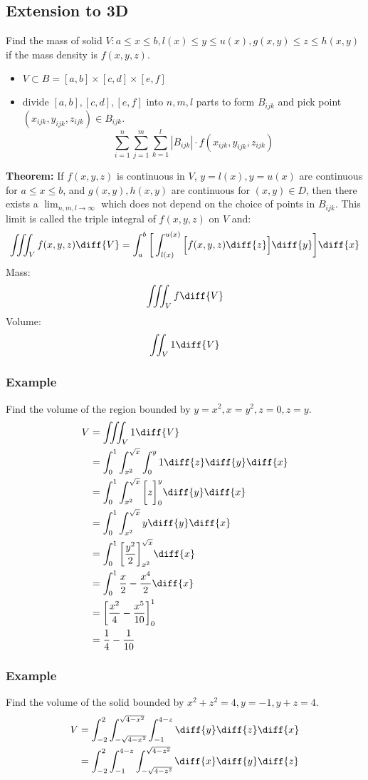 \documentclass{math}
\begin{document}
\subsection*{Extension to 3D}
Find the mass of solid \( V:a\le x\le b, l(x)\le y\le u(x), g(x,y)\le z\le
h(x,y) \) if the mass density is \( f(x,y,z) \).
\begin{itemize}
  \item \( V\subset B = [a,b]\times[c,d]\times[e,f] \)
  \item divide \( [a,b],[c,d],[e,f] \) into \( n,m,l \) parts to form
  \( B_{ijk} \) and pick point \( (x_{ijk},y_{ijk},z_{ijk})\in B_{ijk} \).
  \[ \sum_{i=1}^{n}\sum_{j=1}^{m}\sum_{k=1}^{l}|B_{ijk}|\cdot
    f(x_{ijk},y_{ijk},z_{ijk}) \]
\end{itemize}
\textbf{Theorem:} If \( f(x,y,z) \) is continuous in \( V \), \( y = l(x),
y = u(x) \) are continuous for \( a\le x\le b \), and \( g(x,y),h(x,y) \) are
continuous for \( (x,y)\in D \), then there exists a \( \lim_{n,m,l\to\infty} \)
which does not depend on the choice of points in \( B_{ijk} \). This limit is
called the triple integral of \( f(x,y,z) \) on \( V \) and:
\[ \iiint_{V}f(x,y,z)\diff{V} = \int_{a}^{b}\bigg[\int_{l(x)}^{u(x)}\Big[
  f(x,y,z)\diff{z}\Big]\diff{y}\bigg]\diff{x} \]
Mass:
\[ \iiint_{V}f\diff{V} \]
Volume:
\[ \iint_{V}1\diff{V} \]

\subsubsection*{Example}
Find the volume of the region bounded by \( y = x^2, x = y^2, z = 0, z = y \).
\begin{align*}
  V &= \iiint_{V}1\diff{V} \\
  &= \int_{0}^{1}\int_{x^2}^{\sqrt{x}}\int_{0}^{y}1\diff{z}\diff{y}\diff{x} \\
  &= \int_{0}^{1}\int_{x^2}^{\sqrt{x}}\bigg[z\bigg]_{0}^{y}\diff{y}\diff{x} \\
  &= \int_{0}^{1}\int_{x^2}^{\sqrt{x}}y\diff{y}\diff{x} \\
  &= \int_{0}^{1}\bigg[\frac{y^2}{2}\bigg]_{x^2}^{\sqrt{x}}\diff{x} \\
  &= \int_{0}^{1}\frac{x}{2}-\frac{x^4}{2}\diff{x} \\
  &= \bigg[\frac{x^2}{4}-\frac{x^5}{10}\bigg]_{0}^{1} \\
  &= \frac{1}{4}-\frac{1}{10} \\
\end{align*}

\subsubsection*{Example}
Find the volume of the solid bounded by \( x^2+z^2 = 4, y = -1, y+z = 4 \).
\begin{align*}
  V &= \int_{-2}^{2}\int_{-\sqrt{4-x^2}}^{\sqrt{4-x^2}}
    \int_{-1}^{4-z}\diff{y}\diff{z}\diff{x} \\
  &= \int_{-2}^{2}\int_{-1}^{4-z}\int_{-\sqrt{4-z^2}}^{\sqrt{4-z^2}}
    \diff{x}\diff{y}\diff{z}
\end{align*}
\end{document}
